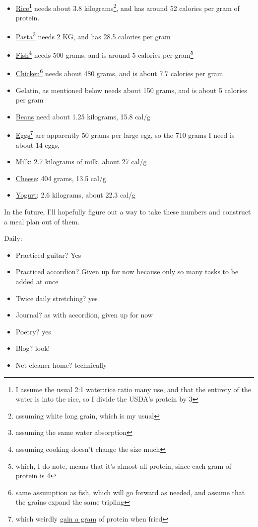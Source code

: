 \documentclass[12pt]{article}[titlepage]
\renewcommand{\,}{\textsuperscript{,}}
\begin{document}
\begin{itemize}  
\item \href{https://fdc.nal.usda.gov/food-details/2512381/nutrients}{Rice}\footnote{I assume the usual 2:1 water:rice ratio many use, and that the entirety of the water is into the rice, so I divide the USDA's protein by 3} needs about 3.8 kilograms\footnote{assuming white long grain, which is my usual}, and has around 52 calories per gram of protein.   
\item \href{https://fdc.nal.usda.gov/food-details/168927/nutrients}{Pasta}\footnote{assuming the same water absorption} needs 2 KG, and has 28.5 calories per gram  
\item \href{https://fdc.nal.usda.gov/food-details/173671/nutrients}{Fish}\footnote{assuming cooking doesn't change the size much} needs 500 grams, and is around 5 calories per gram\footnote{which, I do note, means that it's almost all protein, since each gram of protein is 4}  
\item \href{https://fdc.nal.usda.gov/food-details/2646171/nutrients}{Chicken}\footnote{same assumption as fish, which will go forward as needed, and assume that the grains expand the same tripling} needs about 480 grams, and is about 7.7 calories per gram  
\item Gelatin, as mentioned below needs about 150 grams, and is about 5 calories per gram  
\item \href{https://fdc.nal.usda.gov/food-details/173734/nutrients}{Beans} need about 1.25 kilograms, 15.8 cal/g  
\item \href{https://fdc.nal.usda.gov/food-details/171287/nutrients}{Eggs}\footnote{which weirdly \href{https://fdc.nal.usda.gov/food-details/173423/nutrients}{gain a gram} of protein when fried} are apparently 50 grams per large egg, so the 710 grams I need is about 14 eggs,   
\item \href{https://fdc.nal.usda.gov/food-details/746782/nutrients}{Milk}: 2.7 kilograms of milk, about 27 cal/g  
\item \href{https://fdc.nal.usda.gov/food-details/170845/nutrients}{Cheese}: 404 grams, 13.5 cal/g  
\item \href{https://fdc.nal.usda.gov/food-details/2259793/nutrients}{Yogurt}: 2.6 kilograms, about 22.3 cal/g  
\end{itemize}

In the future, I'll hopefully figure out a way to take these numbers and construct a meal plan out of them.  


Daily:  
\begin{itemize}  
\item Practiced guitar? Yes  
\item Practiced accordion? Given up for now because only so many tasks to be added at once  
\item Twice daily stretching? yes  
\item Journal? as with accordion, given up for now  
\item Poetry? yes  
\item Blog? look!  
\item Net cleaner home? technically  
\end{itemize}
\end{document}
